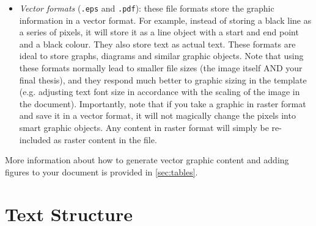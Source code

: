 \documentclass[11pt,twoside,openright]{report}
\begin{document}
\begin{itemize}[noitemsep]
\begin{itemize}[noitemsep]
        \item \emph{Vector formats} (\verb|.eps| and \verb|.pdf|): these file formats store the graphic information in a vector format. For example, instead of storing a black line as a series of pixels, it will store it as a line object with a start and end point and a black colour. They also store text as actual text. These formats are ideal to store graphs, diagrams and similar graphic objects. Note that using these formats normally lead to smaller file sizes (the image itself AND your final thesis), and they respond much better to graphic sizing in the template (e.g. adjusting text font size in accordance with the scaling of the image in the document). Importantly, note that if you take a graphic in raster format and save it in a vector format, it will not magically change the pixels into smart graphic objects. Any content in raster format will simply be re-included as raster content in the file. 
      \end{itemize}
      More information about how to generate vector graphic content and adding figures to your document is provided in \cref{sec:tables}.
  
\end{itemize}



\section{Text Structure}
\label{sec:TextStructure}
\end{document}
